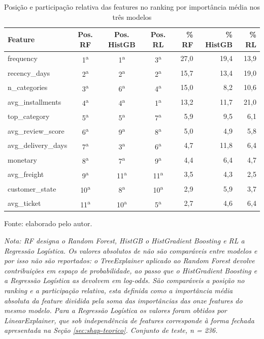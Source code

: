 \begin{table}[htbp]
\ABNTEXfontereduzida
\SingleSpacing
\caption{Posição e participação relativa das features no ranking por importância média \shapabs{} nos três modelos}
\label{tab:shap-tres-modelos}
\centering
\begin{tabular}{@{}lcccrrr@{}}
\hline
\textbf{Feature} & \textbf{Pos. RF} & \textbf{Pos. HistGB} & \textbf{Pos. RL} & \textbf{\% RF} & \textbf{\% HistGB} & \textbf{\% RL} \\
\hline
frequency          & 1\textsuperscript{a}  & 1\textsuperscript{a}  & 3\textsuperscript{a}  & 27,0 & 19,4 & 13,9 \\
recency\_days      & 2\textsuperscript{a}  & 2\textsuperscript{a}  & 2\textsuperscript{a}  & 15,7 & 13,4 & 19,0 \\
n\_categories      & 3\textsuperscript{a}  & 6\textsuperscript{a}  & 4\textsuperscript{a}  & 15,0 & 8,2  & 10,6 \\
avg\_installments  & 4\textsuperscript{a}  & 4\textsuperscript{a}  & 1\textsuperscript{a}  & 13,2 & 11,7 & 21,0 \\
top\_category      & 5\textsuperscript{a}  & 5\textsuperscript{a}  & 7\textsuperscript{a}  & 5,9  & 9,5  & 6,1 \\
avg\_review\_score & 6\textsuperscript{a}  & 9\textsuperscript{a}  & 8\textsuperscript{a}  & 5,0  & 4,9  & 5,8 \\
avg\_delivery\_days& 7\textsuperscript{a}  & 3\textsuperscript{a}  & 6\textsuperscript{a}  & 4,7  & 11,8 & 6,4 \\
monetary           & 8\textsuperscript{a}  & 7\textsuperscript{a}  & 9\textsuperscript{a}  & 4,4  & 6,4  & 4,7 \\
avg\_freight       & 9\textsuperscript{a}  & 11\textsuperscript{a} & 11\textsuperscript{a} & 3,5  & 4,3  & 2,5 \\
customer\_state    & 10\textsuperscript{a} & 8\textsuperscript{a}  & 10\textsuperscript{a} & 2,9  & 5,9  & 3,7 \\
avg\_ticket        & 11\textsuperscript{a} & 10\textsuperscript{a} & 5\textsuperscript{a}  & 2,7  & 4,6  & 6,4 \\
\hline
\end{tabular}
\begin{flushleft}
	\ABNTEXfontereduzida
	\SingleSpacing
	Fonte: elaborado pelo autor.

	\textit{Nota: RF designa o Random Forest, HistGB o HistGradient Boosting e RL a Regressão Logística. Os valores absolutos de \shapabs{} não são comparáveis entre modelos e por isso não são reportados: o TreeExplainer aplicado ao Random Forest devolve contribuições em espaço de probabilidade, ao passo que o HistGradient Boosting e a Regressão Logística as devolvem em log-odds. São comparáveis a posição no ranking e a participação relativa, esta definida como a importância média absoluta da feature dividida pela soma das importâncias das onze features do mesmo modelo. Para a Regressão Logística os valores foram obtidos por LinearExplainer, que sob independência de features corresponde à forma fechada apresentada na Seção \ref{sec:shap-teorico}. Conjunto de teste, n = 236.}
\end{flushleft}
\end{table}

